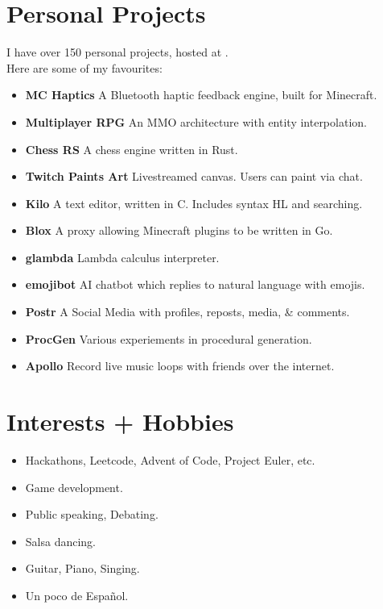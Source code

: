 \documentclass{jcgcv}
\begin{document}
\begin{column}
  \section{Personal Projects}
  I have over 150 personal projects, hosted at
  .\\
  Here are some of my favourites:
  \begin{itemize}
    \item \textbf{MC Haptics} A Bluetooth haptic feedback engine, built for Minecraft.
    \item \textbf{Multiplayer RPG} An MMO architecture with entity interpolation.
    \item \textbf{Chess RS} A chess engine written in Rust.
    \item \textbf{Twitch Paints Art} Livestreamed canvas. Users can paint via chat.
    \item \textbf{Kilo} A text editor, written in C. Includes syntax HL and searching.
    \item \textbf{Blox} A proxy allowing Minecraft plugins to be written in Go.
    \item \textbf{glambda} Lambda calculus interpreter.
    \item \textbf{emojibot} AI chatbot which replies to natural language with emojis.
    \item \textbf{Postr} A Social Media with profiles, reposts, media, \& comments.
    \item \textbf{ProcGen} Various experiements in procedural generation.
    \item \textbf{Apollo} Record live music loops with friends over the internet.
  \end{itemize}

  \section{Interests + Hobbies}
  \begin{itemize}
    \item Hackathons, Leetcode, Advent of Code, Project Euler, etc.
    \item Game development.
    \item Public speaking, Debating.
    \item Salsa dancing.
    \item Guitar, Piano, Singing.
    \item Un poco de Espa\~nol.
  \end{itemize}

\end{column}
\end{document}
